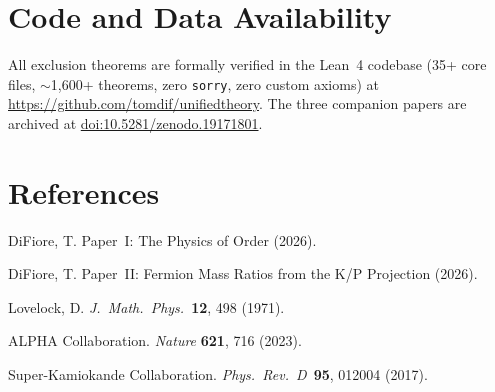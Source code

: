 \documentclass[11pt,letterpaper]{article}
\begin{document}
\section*{Code and Data Availability}

All exclusion theorems are formally verified in the Lean~4 codebase
(35+ core files, $\sim$1{,}600+ theorems, zero \texttt{sorry}, zero custom
axioms) at \url{https://github.com/tomdif/unifiedtheory}.
The three companion papers are archived at
\href{https://doi.org/10.5281/zenodo.19171801}{doi:10.5281/zenodo.19171801}.

\section*{References}
\begin{enumerate}[label={[\arabic*]}]
  \item DiFiore, T. Paper~I: The Physics of Order (2026).
  \item DiFiore, T. Paper~II: Fermion Mass Ratios from the K/P
    Projection (2026).
  \item Lovelock, D. \textit{J.\ Math.\ Phys.}\ \textbf{12},
    498 (1971).
  \item ALPHA Collaboration. \textit{Nature} \textbf{621}, 716
    (2023).
  \item Super-Kamiokande Collaboration. \textit{Phys.\ Rev.\ D}\
    \textbf{95}, 012004 (2017).
\end{enumerate}
\end{document}
